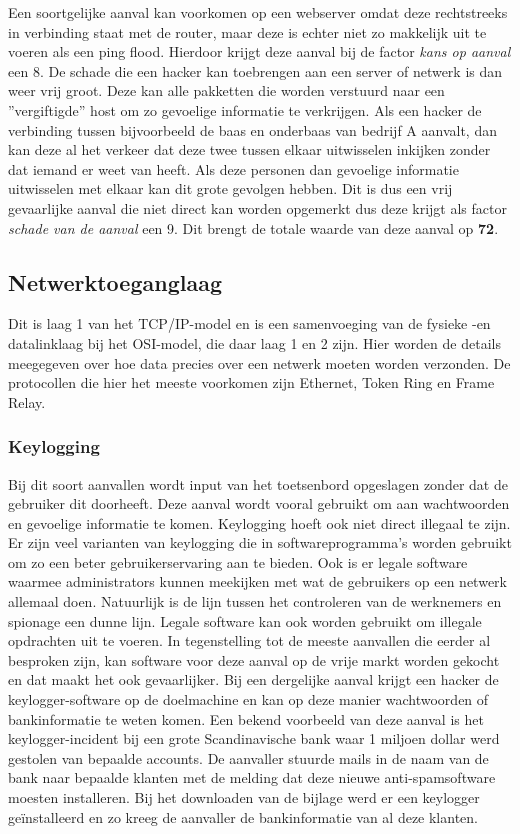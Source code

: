\documentclass[pdftex,a4paper,12pt]{report}
\begin{document}
Een soortgelijke aanval kan voorkomen op een webserver omdat deze rechtstreeks in verbinding staat met de router, maar deze is echter niet zo makkelijk uit te voeren als een ping flood. Hierdoor krijgt deze aanval bij de factor \textit{kans op aanval} een 8. De schade die een hacker kan toebrengen aan een server of netwerk is dan weer vrij groot. Deze kan alle pakketten die worden verstuurd naar een ''vergiftigde'' host om zo gevoelige informatie te verkrijgen. Als een hacker de verbinding tussen bijvoorbeeld de baas en onderbaas van bedrijf A aanvalt, dan kan deze al het verkeer dat deze twee tussen elkaar uitwisselen inkijken zonder dat iemand er weet van heeft. Als deze personen dan gevoelige informatie uitwisselen met elkaar kan dit grote gevolgen hebben. Dit is dus een vrij gevaarlijke aanval die niet direct kan worden opgemerkt dus deze krijgt als factor \textit{schade van de aanval} een 9. Dit brengt de totale waarde van deze aanval op \textbf{72}.

\subsection{Netwerktoeganglaag}
Dit is laag 1 van het TCP/IP-model en is een samenvoeging van de fysieke -en datalinklaag bij het OSI-model, die daar laag 1 en 2 zijn. Hier worden de details meegegeven over hoe data precies over een netwerk moeten worden verzonden. De protocollen die hier het meeste voorkomen zijn Ethernet, Token Ring en Frame Relay. 

\subsubsection{Keylogging}
Bij dit soort aanvallen wordt input van het toetsenbord opgeslagen zonder dat de gebruiker dit doorheeft. Deze aanval wordt vooral gebruikt om aan wachtwoorden en gevoelige informatie te komen. Keylogging hoeft ook niet direct illegaal te zijn. Er zijn veel varianten van keylogging die in softwareprogramma's worden gebruikt om zo een beter gebruikerservaring aan te bieden. Ook is er legale software waarmee administrators kunnen meekijken met wat de gebruikers op een netwerk allemaal doen. Natuurlijk is de lijn tussen het controleren van de werknemers en spionage een dunne lijn. Legale software kan ook worden gebruikt om illegale opdrachten uit te voeren. In tegenstelling tot de meeste aanvallen die eerder al besproken zijn, kan software voor deze aanval op de vrije markt worden gekocht en dat maakt het ook gevaarlijker. Bij een dergelijke aanval krijgt een hacker de keylogger-software op de doelmachine en kan op deze manier wachtwoorden of bankinformatie te weten komen. Een bekend voorbeeld van deze aanval is het keylogger-incident bij een grote Scandinavische bank waar 1 miljoen dollar werd gestolen van bepaalde accounts. De aanvaller stuurde mails in de naam van de bank naar bepaalde klanten met de melding dat deze nieuwe anti-spamsoftware moesten installeren. Bij het downloaden van de bijlage werd er een keylogger geïnstalleerd en zo kreeg de aanvaller de bankinformatie van al deze klanten. \citep{Grebennikov2007} \newline
 
\end{document}
